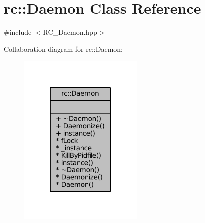 \hypertarget{classrc_1_1Daemon}{\section{rc\+:\+:Daemon Class Reference}
\label{classrc_1_1Daemon}
}


{\ttfamily \#include $<$R\+C\+\_\+\+Daemon.\+hpp$>$}



Collaboration diagram for rc\+:\+:Daemon\+:\nopagebreak
\begin{figure}[H]
\begin{center}
\leavevmode
\includegraphics[width=170pt]{classrc_1_1Daemon__coll__graph}
\end{center}
\end{figure}
